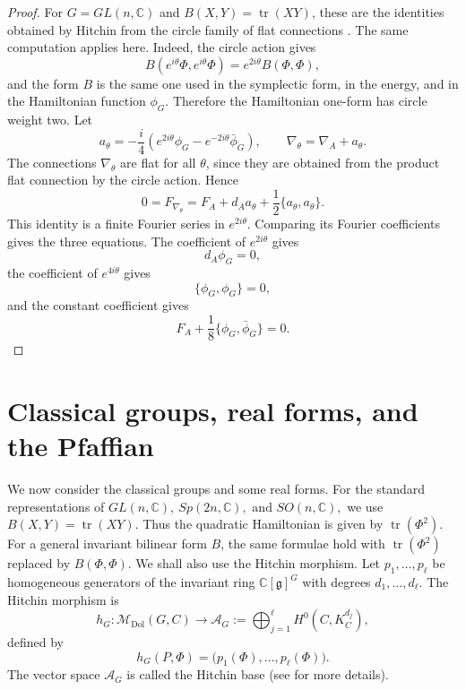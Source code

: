 \documentclass[11pt,reqno]{amsart}
\numberwithin{equation}{section}
\theoremstyle{plain}
\theoremstyle{definition}
\theoremstyle{remark}
\begin{document}
\begin{proof}
For \(G=GL(n,\mathbb C)\) and \(B(X,Y)=\operatorname{tr}(XY)\), these are the
identities obtained by Hitchin from the circle family of flat connections
\cite[Sec.~3]{HitchinUniversal}. The same computation applies here. Indeed, the circle action gives
\[
        B(e^{i\theta}\Phi,e^{i\theta}\Phi)
        =
        e^{2i\theta}B(\Phi,\Phi),
\]
and the form \(B\) is the same one used in the symplectic form, in the energy,
and in the Hamiltonian function \(\phi_G\). Therefore the Hamiltonian one-form
has circle weight two. Let
\[
        a_\theta
        =
        -
        \frac{i}{4}
        \left(
        e^{2i\theta}\phi_G
        -
        e^{-2i\theta}\bar\phi_G
        \right),
        \qquad
        \nabla_\theta=\nabla_A+a_\theta .
\]
The connections \(\nabla_\theta\) are flat for all \(\theta\), since they are
obtained from the product flat connection by the circle action. Hence
\[
        0
        =
        F_{\nabla_\theta}
        =
        F_A+d_Aa_\theta+\frac12\{a_\theta,a_\theta\}.
\]
This identity is a finite Fourier series in \(e^{2i\theta}\).  Comparing its
Fourier coefficients gives the three equations. The coefficient of
\(e^{2i\theta}\) gives
\[
        d_A\phi_G=0,
\]
the coefficient of \(e^{4i\theta}\) gives
\[
        \{\phi_G,\phi_G\}=0,
\]
and the constant coefficient gives
\[
        F_A+\frac18\{\phi_G,\bar\phi_G\}=0.
\]
\end{proof}

\section{Classical groups, real forms, and the Pfaffian}
\label{sec:classical}

We now consider the classical groups and some real forms.  For the standard
representations of
\(
        GL(n,\mathbb C), \ Sp(2n,\mathbb C),\text{ and } SO(n,\mathbb C),
\)
we use
\(
        B(X,Y)=\operatorname{tr}(XY).
\)
Thus the quadratic Hamiltonian is given by \(\operatorname{tr}(\Phi^2)\). For a general invariant bilinear form \(B\), the same formulae hold with
\(\operatorname{tr}(\Phi^2)\) replaced by \(B(\Phi,\Phi)\). We shall also use the Hitchin morphism. Let
\(
        p_1,\ldots,p_\ell
\)
be homogeneous generators of the invariant ring
\(
        \mathbb C[\mathfrak g]^G
\)
with degrees
\(
        d_1,\ldots,d_\ell.
\)
The Hitchin morphism is
\[
        h_G:\mathcal M_{\mathrm{Dol}}(G,C)
        \longrightarrow
        \mathcal A_G
        :=
        \bigoplus_{j=1}^{\ell}H^0(C,K_C^{d_j}),
\]
defined by
\[
        h_G(P,\Phi)
        =
        \bigl(p_1(\Phi),\ldots,p_\ell(\Phi)\bigr).
\]
The vector space \(\mathcal A_G\) is called the Hitchin base (see
\cite{Hitchin1987,DonagiPantev} for more details).
\end{document}
